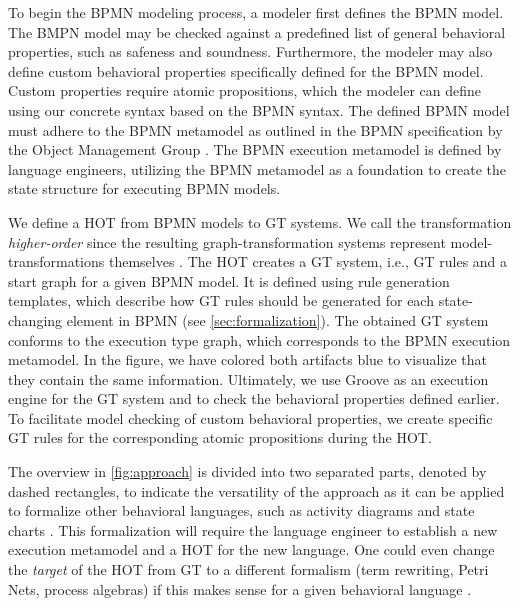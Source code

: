 \documentclass{lmcs} %
\begin{document}
To begin the BPMN modeling process, a modeler first defines the BPMN model. 
The BMPN model may be checked against a predefined list of general behavioral properties, such as safeness and soundness.
Furthermore, the modeler may also define custom behavioral properties specifically defined for the BPMN model.
Custom properties require atomic propositions, which the modeler can define using our concrete syntax based on the BPMN syntax.
The defined BPMN model must adhere to the BPMN metamodel as outlined in the BPMN specification by the Object Management Group \cite{objectmanagementgroupBusinessProcessModel2013}.
The BPMN execution metamodel is defined by language engineers, utilizing the BPMN metamodel as a foundation to create the state structure for executing BPMN models. 

We define a HOT from BPMN models to GT systems.
We call the transformation \textit{higher-order} since the resulting graph-transformation systems represent model-transformations themselves \cite{tisiUseHigherOrderModel2009}.
The HOT creates a GT system, i.e., GT rules and a start graph for a given BPMN model.
It is defined using rule generation templates, which describe how GT rules should be generated for each state-changing element in BPMN (see \autoref{sec:formalization}).
The obtained GT system conforms to the execution type graph, which corresponds to the BPMN execution metamodel.
In the figure, we have colored both artifacts blue to visualize that they contain the same information.
Ultimately, we use Groove as an execution engine for the GT system and to check the behavioral properties defined earlier.
To facilitate model checking of custom behavioral properties, we create specific GT rules for the corresponding atomic propositions during the HOT.

The overview in \autoref{fig:approach} is divided into two separated parts, denoted by dashed rectangles, to indicate the versatility of the approach as it can be applied to formalize other behavioral languages, such as activity diagrams and state charts \cite{seidlUMLClassroom2015, objectmanagementgroupUnifiedModelingLanguage2017}.
This formalization will require the language engineer to establish a new execution metamodel and a HOT for the new language.
One could even change the \textit{target} of the HOT from GT to a different formalism (term rewriting, Petri Nets, process algebras) if this makes sense for a given behavioral language \cite{krauterBehavioralConsistencyMultimodeling2023}.
\end{document}
